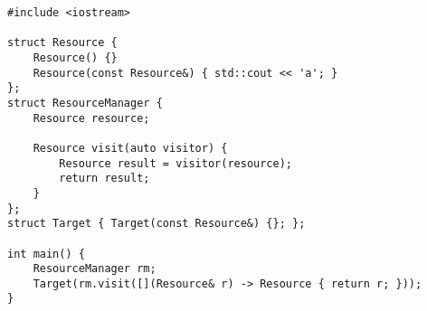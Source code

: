 \begin{lstlisting}[title=\href{https://godbolt.org/z/07JV2m}{\texttt{godbolt.org/z/07JV2m}}]
#include <iostream>

struct Resource {
    Resource() {}
    Resource(const Resource&) { std::cout << 'a'; }
};
struct ResourceManager {
    Resource resource;
 
    Resource visit(auto visitor) {
        Resource result = visitor(resource);
        return result;
    }
};
struct Target { Target(const Resource&) {}; };

int main() {
    ResourceManager rm;
    Target(rm.visit([](Resource& r) -> Resource { return r; }));
}
\end{lstlisting}
